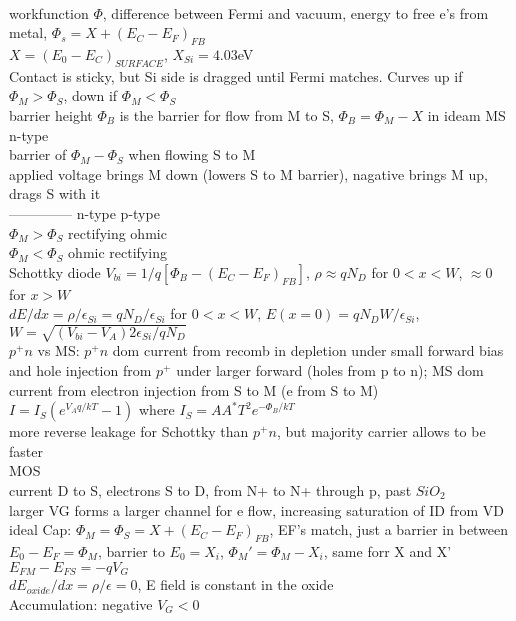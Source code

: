 \documentclass{article}
\begin{document}
\begin{large}
\\workfunction $\Phi$, difference between Fermi and vacuum, energy to free e's from metal, $\Phi_s=X+(E_C-E_F)_{FB}$
\\$X=(E_0-E_C)_{SURFACE}$, $X_{Si}=4.03$eV
\\Contact is sticky, but Si side is dragged until Fermi matches. Curves up if $\Phi_M>\Phi_S$, down if $\Phi_M<\Phi_S$
\\barrier height $\Phi_B$ is the barrier for flow from M to S, $\Phi_B=\Phi_M-X$ in ideam MS n-type 
\\barrier of $\Phi_M-\Phi_S$ when flowing S to M
\\applied voltage brings M down (lowers S to M barrier), nagative brings M up, drags S with it
\\-------------- n-type  p-type
\\$\Phi_M>\Phi_S$ rectifying ohmic
\\$\Phi_M<\Phi_S$ ohmic rectifying
\\Schottky diode $V_{bi}=1/q [\Phi_B-(E_C-E_F)_{FB}]$, $\rho\approx qN_D$ for $0<x<W$, $\approx0$ for $x>W$
\\$dE/dx=\rho/\epsilon_{Si}=qN_D/\epsilon_{Si}$ for $0<x<W$, $E(x=0)=qN_DW/\epsilon_{Si}$, $W=\sqrt{(V_{bi}-V_A)2\epsilon_{Si}/qN_D}$
\\$p^+n$ vs MS: $p^+n$ dom current from recomb in depletion under small forward bias and hole injection from $p^+$ under larger forward (holes from p to n); MS dom current from electron injection from S to M (e from S to M)
\\$I=I_S(e^{V_A q/kT}-1)$ where $I_S=A A^* T^2 e^{-\Phi_B/kT}$
\\more reverse leakage for Schottky than $p^+n$, but majority carrier allows to be faster
\\MOS
\\current D to S, electrons S to D, from N+ to N+ through p, past $SiO_2$
\\larger VG forms a larger channel for e flow, increasing saturation of ID from VD
\\ideal Cap: $\Phi_M=\Phi_S=X+(E_C-E_F)_{FB}$, EF's match, just a barrier in between
\\$E_0-E_F=\Phi_M$, barrier to $E_0=X_i$, $\Phi_M'=\Phi_M-X_i$, same forr X and X'
\\$E_{FM}-E_{FS}=-qV_G$
\\$dE_{oxide}/dx=\rho/\epsilon=0$, E field is constant in the oxide
\\Accumulation: negative $V_G<0$

\end{large}
\end{document}
